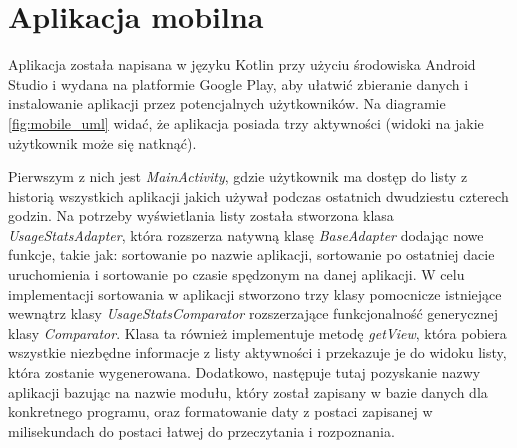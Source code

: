 \documentclass[a4paper,twoside,12pt]{book}
\begin{document}
\section{Aplikacja mobilna}
\label{mobile}
Aplikacja została napisana w języku Kotlin przy użyciu środowiska Android Studio i wydana na platformie Google Play, aby ułatwić zbieranie danych i instalowanie aplikacji przez potencjalnych użytkowników.
Na diagramie \ref{fig:mobile_uml} widać, że aplikacja posiada trzy aktywności (widoki na jakie użytkownik może się natknąć). 

Pierwszym z nich jest \textit{MainActivity}, gdzie użytkownik ma dostęp do listy z historią wszystkich aplikacji jakich używał podczas ostatnich dwudziestu czterech godzin. Na potrzeby wyświetlania listy została stworzona klasa \textit{UsageStatsAdapter}, która rozszerza natywną klasę \textit{BaseAdapter} dodając nowe funkcje, takie jak: sortowanie po nazwie aplikacji, sortowanie po ostatniej dacie uruchomienia i sortowanie po czasie spędzonym na danej aplikacji. W celu implementacji sortowania w aplikacji stworzono trzy klasy pomocnicze istniejące wewnątrz klasy \textit{UsageStatsComparator} rozszerzające funkcjonalność generycznej klasy \textit{Comparator}. Klasa ta również implementuje metodę \textit{getView}, która pobiera wszystkie niezbędne informacje z listy aktywności i przekazuje je do widoku listy, która zostanie wygenerowana. Dodatkowo, następuje tutaj pozyskanie nazwy aplikacji bazując na nazwie modułu, który został zapisany w bazie danych dla konkretnego programu, oraz formatowanie daty z postaci zapisanej w milisekundach do postaci łatwej do przeczytania i rozpoznania. 
\end{document}
